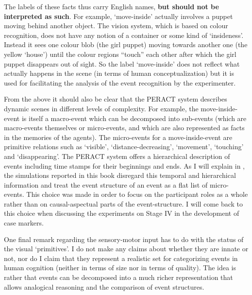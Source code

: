 The labels of these facts thus carry English names, {\bfseries but should not be interpreted as such}. For example, `move-inside' actually involves a puppet moving behind another object. The vision system, which is based on colour recognition, does not have any notion of a container or some kind of `insideness'. Instead it sees one colour blob (the girl puppet) moving towards another one (the yellow `house') until the colour regions ``touch'' each other after which the girl puppet disappears out of sight. So the label `move-inside' does not reflect what actually happens in the scene (in terms of human conceptualization) but it is used for facilitating the analysis of the event recognition by the experimenter.

From the above it should also be clear that the PERACT system describes dynamic scenes in different levels of complexity. For example, the move-inside-event is itself a macro-event which can be decomposed into sub-events (which are macro-events themselves or micro-events, and which are also represented as facts in the memories of the agents). The micro-events for a move-inside-event are primitive relations such as `visible', `distance-decreasing', `movement', `touching' and `disappearing'. The PERACT system offers a hierarchical description of events including time stamps for their beginnings and ends. As I will explain in , the simulations reported in this book disregard this temporal and hierarchical information and treat the event structure of an event as a flat list of micro-events. This choice was made in order to focus on the participant roles as a whole rather than on causal-aspectual parts of the event-structure. I will come back to this choice when discussing the experiments on Stage IV in the development of case markers.

One final remark regarding the sensory-motor input has to do with the status of the visual `primitives'. I do not make any claims about whether they are innate or not, nor do I claim that they represent a realistic set for categorizing events in human cognition (neither in terms of size nor in terms of quality). The idea is rather that events can be decomposed into a much richer representation that allows analogical reasoning and the comparison of event structures.


